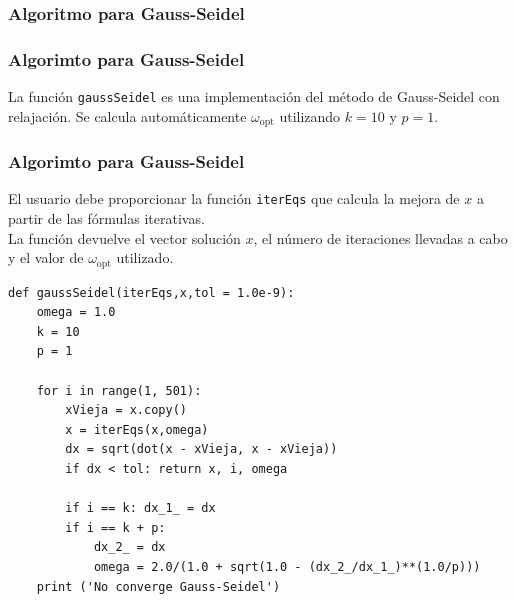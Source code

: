\subsubsection{Algoritmo para Gauss-Seidel}
\begin{frame}
\frametitle{Algorimto para Gauss-Seidel}
La función \texttt{gaussSeidel} es una implementación del método de Gauss-Seidel con relajación. Se calcula automáticamente $\omega_{\mbox{opt}}$ utilizando $k = 10$ y $p = 1$.
\end{frame}
\begin{frame}
\frametitle{Algorimto para Gauss-Seidel}
El usuario debe proporcionar la función \texttt{iterEqs} que calcula la mejora de $x$ a partir de las fórmulas iterativas. 
\\
\bigskip
La función devuelve el vector solución $x$, el número de iteraciones llevadas a cabo y el valor de $\omega_{\mbox{opt}}$ utilizado.
\end{frame}
\begin{frame}
\begin{lstlisting}[caption=Función Gauss-Seidel, style=FormattedNumber, basicstyle=\linespread{1.1}\ttfamily=\small, columns=fullflexible]
def gaussSeidel(iterEqs,x,tol = 1.0e-9):
    omega = 1.0
    k = 10
    p = 1
    
    for i in range(1, 501):
        xVieja = x.copy()
        x = iterEqs(x,omega)
        dx = sqrt(dot(x - xVieja, x - xVieja))
        if dx < tol: return x, i, omega
        
        if i == k: dx_1_ = dx
        if i == k + p:
            dx_2_ = dx
            omega = 2.0/(1.0 + sqrt(1.0 - (dx_2_/dx_1_)**(1.0/p)))
	print ('No converge Gauss-Seidel')
\end{lstlisting} 
\end{frame}
